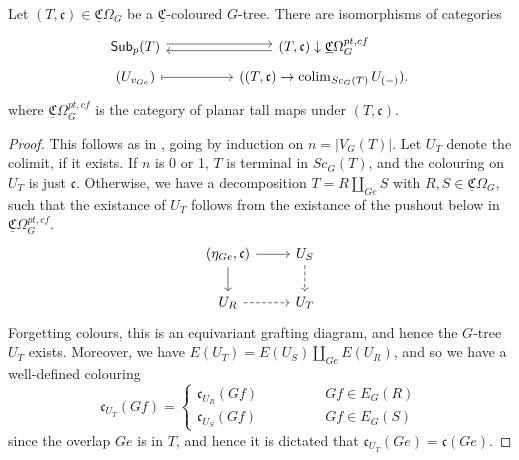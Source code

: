 \documentclass[psamsfonts,onesided,10pt
,draft
]{amsart}%
\begin{document}
\begin{lemma}[{cf. \cite[Prop. 3.41]{BP17}}]
      Let $(T,\mathfrak c) \in \underline{\mathfrak C}\Omega_G$ be a $\underline{\mathfrak C}$-coloured $G$-tree.
      There are isomorphisms of categories
      \begin{equation}
            \begin{tikzcd}[row sep = 4pt]
                  \mathsf{Sub}_p(T) \arrow[rr, shift left]
                  &&
                  (T, \mathfrak c) \downarrow \underline{\mathfrak C}\Omega_G^{pt,cf}
                  \arrow[ll, shift left]
                  \\
                  (U_{v_{Ge}}) \arrow[rr, mapsto]
                  &&
                  ((T, \mathfrak c) \to \colim_{Sc_G(T)}U_{(-)}).
            \end{tikzcd}
      \end{equation}
      where $\underline{\mathfrak C}\Omega_G^{pt,cf}$ is the category of planar tall maps under $(T, \mathfrak c)$. 
\end{lemma}
\begin{proof}
      This follows as in \cite[Prop. 3.41]{BP17}, going by induction on $n=|V_G(T)|$.
      Let $U_T$ denote the colimit, if it exists.
      If $n$ is 0 or 1, $T$ is terminal in $Sc_G(T)$, and the colouring on $U_T$ is just $\mathfrak c$.
      Otherwise, we have a decomposition $T = R \amalg_{Ge} S$ with $R,S \in \underline{\mathfrak C}\Omega_G$, such that
      the existance of $U_T$ follows from the existance of the pushout below in $\underline{\mathfrak C}\Omega_G^{pt,cf}$.
      \begin{equation}
            \begin{tikzcd}
                  (\eta_{Ge}, \mathfrak c) \arrow[d] \arrow[r]
                  &
                  U_S \arrow[d, dashed]
                  \\
                  U_R \arrow[r, dashed]
                  &
                  U_T
            \end{tikzcd}
      \end{equation}
      Forgetting colours, this is an equivariant grafting diagram, and hence the $G$-tree $U_T$ exists.
      Moreover, we have $E(U_T) = E(U_S) \amalg_{Ge} E(U_R)$, and so we have a well-defined colouring
      \begin{equation}
            \mathfrak c_{U_T}(Gf) =
            \begin{cases}
                  \mathfrak c_{U_R}(Gf) \qquad \qquad & Gf \in E_G(R) \\
                  \mathfrak c_{U_S}(Gf) & Gf \in E_G(S)
            \end{cases}
      \end{equation}
      since the overlap $Ge$ is in $T$, and hence it is dictated that $\mathfrak c_{U_T}(Ge) = \mathfrak c (Ge)$.
\end{proof}
\end{document}
